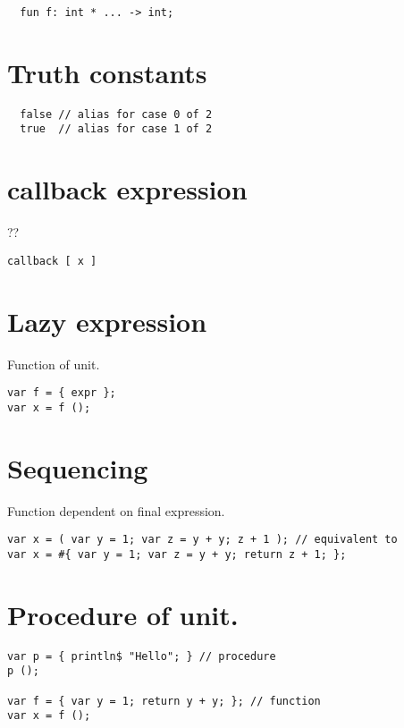 \documentclass[oneside]{book}
\begin{document}
\begin{verbatim}
  fun f: int * ... -> int;
\end{verbatim}


\section{Truth constants}

\begin{verbatim}
  false // alias for case 0 of 2
  true  // alias for case 1 of 2
\end{verbatim}


\section{callback expression}
??

\begin{verbatim}
callback [ x ]
\end{verbatim}


\section{Lazy expression}
Function of unit.

\begin{verbatim}
var f = { expr };
var x = f ();
\end{verbatim}


\section{Sequencing}
Function dependent on final expression.

\begin{verbatim}
var x = ( var y = 1; var z = y + y; z + 1 ); // equivalent to
var x = #{ var y = 1; var z = y + y; return z + 1; };
\end{verbatim}


\section{Procedure of unit.}

\begin{verbatim}
var p = { println$ "Hello"; } // procedure
p (); 

var f = { var y = 1; return y + y; }; // function
var x = f ();
\end{verbatim}
\end{document}
